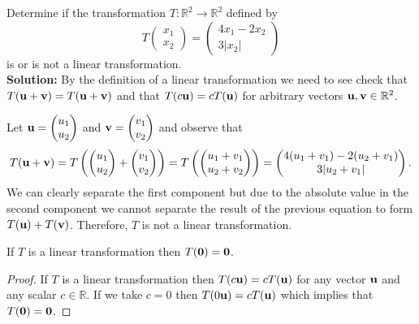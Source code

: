 \begin{example}
    Determine if the transformation $T: \mathbb{R}^2 \to \mathbb{R}^2$ defined by 
    \[ T\begin{pmatrix} x_1 \\ x_2 \end{pmatrix} = \begin{pmatrix} 4x_1 - 2x_2 \\ 3 |x_2|
    \end{pmatrix} \]
    is or is not a linear transformation.\\
    {\bf Solution:} By the definition of a linear transformation we need to see check that
    $T({\bf u} + {\bf v}) = T({\bf u}+{\bf v})$ and that $T(c{\bf u}) = cT({\bf u})$ for arbitrary vectors
    ${\bf u},{\bf v}\in\mathbb{R}^2$.  

    Let ${\bf u} = \begin{pmatrix} u_1 \\ u_2 \end{pmatrix}$ and ${\bf v} = \begin{pmatrix} v_1 \\
        v_2 \end{pmatrix}$ and observe that 
    \[ T({\bf u} + {\bf v}) = T\left(\begin{pmatrix} u_1 \\ u_2 \end{pmatrix} + \begin{pmatrix} v_1
        \\ v_2 \end{pmatrix} \right) = T\left( \begin{pmatrix} u_1 + v_1 \\ u_2 + v_2
\end{pmatrix} \right) = \begin{pmatrix} 4(u_1+v_1) - 2(u_2 + v_1) \\ 3 |u_2+v_1|
\end{pmatrix}. \]
    We can clearly separate the first component but due to the absolute value in the
    second component we cannot separate the result of the previous equation to form
    $T({\bf u})+T({\bf v})$.  Therefore, $T$ is not a linear transformation.
\end{example}

\begin{thm}
    If $T$ is a linear transformation then $T({\bf 0}) = {\bf 0}$.
\end{thm}
\begin{proof}
    If $T$ is a linear transformation then $T(c{\bf u}) = cT({\bf u})$ for any vector ${\bf u}$ and
    any scalar $c\in\mathbb{R}$.  If we take $c=0$ then $T(0{\bf u}) = cT({\bf u})$ which implies
that $T({\bf 0}) = {\bf 0}$.
\end{proof}

